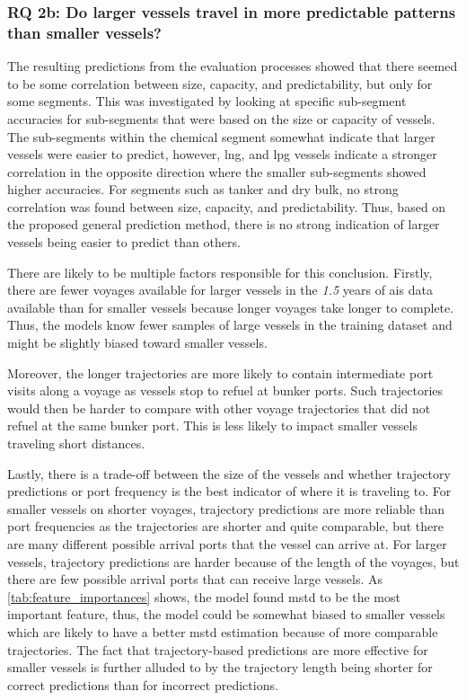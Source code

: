 \subsubsection{RQ 2b: Do larger vessels travel in more predictable patterns than smaller vessels?}

The resulting predictions from the evaluation processes showed that there seemed to be some correlation between size, capacity, and predictability, but only for some segments. This was investigated by looking at specific sub-segment accuracies for sub-segments that were based on the size or capacity of vessels. The sub-segments within the chemical segment somewhat indicate that larger vessels were easier to predict, however, \acrshort{lng}, and \acrshort{lpg} vessels indicate a stronger correlation in the opposite direction where the smaller sub-segments showed higher accuracies. For segments such as tanker and dry bulk, no strong correlation was found between size, capacity, and predictability. Thus, based on the proposed general prediction method, there is no strong indication of larger vessels being easier to predict than others.

There are likely to be multiple factors responsible for this conclusion. Firstly, there are fewer voyages available for larger vessels in the \textit{1.5} years of \acrshort{ais} data available than for smaller vessels because longer voyages take longer to complete. Thus, the models know fewer samples of large vessels in the training dataset and might be slightly biased toward smaller vessels.

Moreover, the longer trajectories are more likely to contain intermediate port visits along a voyage as vessels stop to refuel at bunker ports. Such trajectories would then be harder to compare with other voyage trajectories that did not refuel at the same bunker port. This is less likely to impact smaller vessels traveling short distances.

Lastly, there is a trade-off between the size of the vessels and whether trajectory predictions or port frequency is the best indicator of where it is traveling to. For smaller vessels on shorter voyages, trajectory predictions are more reliable than port frequencies as the trajectories are shorter and quite comparable, but there are many different possible arrival ports that the vessel can arrive at. For larger vessels, trajectory predictions are harder because of the length of the voyages, but there are few possible arrival ports that can receive large vessels. As \cref{tab:feature_importances} shows, the model found \acrshort{mstd} to be the most important feature, thus, the model could be somewhat biased to smaller vessels which are likely to have a better \acrshort{mstd} estimation because of more comparable trajectories. The fact that trajectory-based predictions are more effective for smaller vessels is further alluded to by the trajectory length being shorter for correct predictions than for incorrect predictions.

